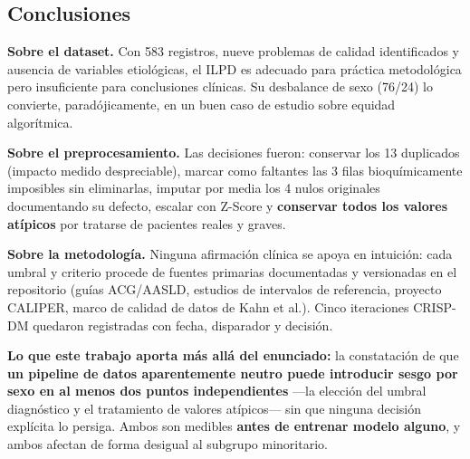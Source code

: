 \documentclass[10pt,a4paper]{article}
\begin{document}
\subsection{Conclusiones}

\textbf{Sobre el dataset.} Con 583 registros, nueve problemas de calidad identificados y ausencia de variables etiológicas, el ILPD es adecuado para práctica metodológica pero insuficiente para conclusiones clínicas. Su desbalance de sexo (76/24) lo convierte, paradójicamente, en un buen caso de estudio sobre equidad algorítmica.

\textbf{Sobre el preprocesamiento.} Las decisiones fueron: conservar los 13 duplicados (impacto medido despreciable), marcar como faltantes las 3 filas bioquímicamente imposibles sin eliminarlas, imputar por media los 4 nulos originales documentando su defecto, escalar con Z-Score y \textbf{conservar todos los valores atípicos} por tratarse de pacientes reales y graves.

\textbf{Sobre la metodología.} Ninguna afirmación clínica se apoya en intuición: cada umbral y criterio procede de fuentes primarias documentadas y versionadas en el repositorio (guías ACG/AASLD, estudios de intervalos de referencia, proyecto CALIPER, marco de calidad de datos de Kahn et al.). Cinco iteraciones CRISP-DM quedaron registradas con fecha, disparador y decisión.

\textbf{Lo que este trabajo aporta más allá del enunciado:} la constatación de que \textbf{un pipeline de datos aparentemente neutro puede introducir sesgo por sexo en al menos dos puntos independientes} ---la elección del umbral diagnóstico y el tratamiento de valores atípicos--- sin que ninguna decisión explícita lo persiga. Ambos son medibles \textbf{antes de entrenar modelo alguno}, y ambos afectan de forma desigual al subgrupo minoritario.

\end{document}
